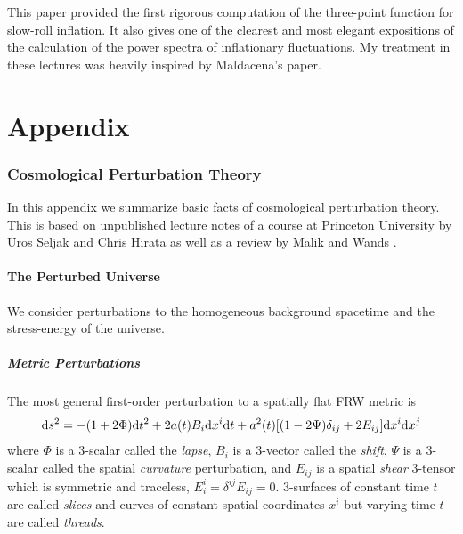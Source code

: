 \documentclass[12pt,letterpaper,rotate]{article}
\def\beq{\begin{equation}}
\def\eeq{\end{equation}}
\def\d{{\rm d}}
\begin{document}
{\begin{itemize}
{\small This paper provided the first rigorous computation of the three-point function for slow-roll inflation. It also gives one of the clearest and most elegant expositions of the calculation of the power spectra of inflationary fluctuations. My treatment in these lectures was heavily inspired by Maldacena's paper.}


{\small }
\end{itemize}

\newpage
\appendix

\part{Appendix}
\section{Cosmological Perturbation Theory}
\label{sec:CPT}
\setcounter{equation}{0}
\renewcommand{\theequation}{A.\arabic{equation}}


In this appendix we summarize basic facts of cosmological perturbation theory.
This is based on unpublished lecture notes of a course at Princeton University by Uros Seljak and Chris Hirata as well as a review by Malik and Wands \cite{Malik:2008im}.
 
\subsection{The Perturbed Universe}


We consider perturbations to the homogeneous background spacetime and the stress-energy of the universe. 

\subsubsection{Metric Perturbations}

The most general first-order perturbation to a spatially flat FRW metric is
\beq
\label{equ:SVTmetric}
\d s^2 = -(1+2 \Phi) \d t^2 + 2  a(t) B_{i} \d x^i \d t + a^2(t) [(1- 2 \Psi) \delta_{ij} + 2 E_{ij}] \d x^i \d x^j 
\eeq
where $\Phi$ is a 3-scalar called the {\it lapse}, $B_i$ is a 3-vector called the {\it shift}, $\Psi$ is a 3-scalar called the spatial {\it curvature} perturbation, and $E_{ij}$ is a spatial {\it shear} 3-tensor which is symmetric and traceless, $E^i_i = \delta^{ij} E_{ij}=0$.
3-surfaces of constant time  $t$ are called {\it slices} and curves of constant spatial coordinates $x^i$ but varying time $t$ are called {\it threads}.

}
\end{document}
